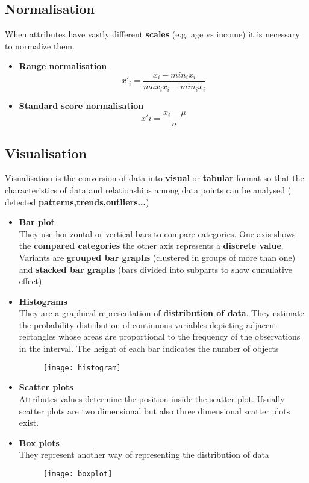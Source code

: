 \subsection{Normalisation}
When attributes have vastly different \textbf{scales}  (e.g. age vs income) it is necessary to normalize them.
\begin{itemize}
\item \textbf{Range normalisation}\\
$$ x'_i= \frac{x_i - min_i x_i}{max_i x_i - min_i x_i}$$
\item \textbf{Standard score normalisation}\\
$$x'i=\frac{x_i - \mu }{\sigma}$$
\end{itemize}

\subsection{Visualisation}
Visualisation is the conversion of data into \textbf{visual} or \textbf{tabular} format so that the characteristics of data and relationships among data points can be analysed ( detected \textbf{patterns,trends,outliers...})\\
\begin{itemize}
\item \textbf{Bar plot}\\
They use horizontal or vertical bars to compare categories. One axis shows the \textbf{compared categories} the other axis represents a \textbf{discrete value}. Variants are \textbf{grouped bar graphs} (clustered in groups of more than one) and \textbf{stacked bar graphs} (bars divided into subparts to show cumulative effect)
\item \textbf{Histograms}\\
They are a graphical representation of \textbf{distribution of data}. They estimate the probability distribution of continuous variables depicting adjacent rectangles whose areas are proportional to the frequency of the observations in the interval. The height of each bar indicates the number of objects
\begin{figure}[H]
 \centering
 \texttt{[image: histogram]}
\end{figure}
\item \textbf{Scatter plots}\\
Attributes values determine the position inside the scatter plot. Usually scatter plots are two dimensional but also three dimensional scatter plots exist.
\item \textbf{Box plots}\\
They represent another way of representing the distribution of data
\begin{figure}[H]
 \centering
 \texttt{[image: boxplot]}
\end{figure}
\end{itemize}

